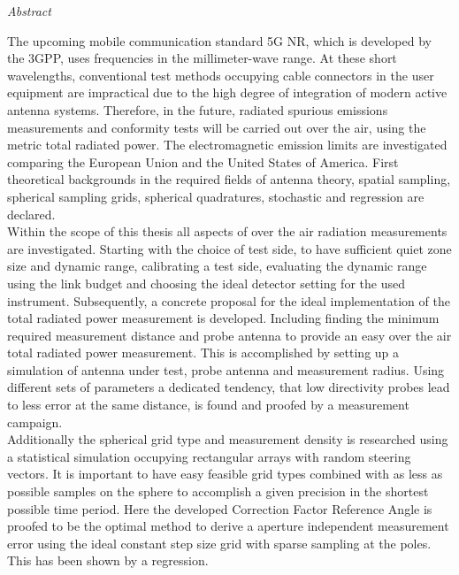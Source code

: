 

\newpage
\thispagestyle{empty}
\begin{center}
\Huge\emph{Abstract}
\end{center}
\medskip
\noindent

The upcoming mobile communication standard 5G NR, which is developed by the 3GPP, uses frequencies in the millimeter-wave range.
At these short wavelengths, conventional test methods occupying cable connectors in the user equipment are impractical due to the high degree of integration of modern active antenna systems.
Therefore, in the future, radiated spurious emissions measurements and conformity tests will be carried out over the air, using the metric total radiated power.
The electromagnetic emission limits are investigated comparing the European Union and the United States of America.
First theoretical backgrounds in the required fields of antenna theory, spatial sampling, spherical sampling grids, spherical quadratures, stochastic and regression are declared.\\

Within the scope of this thesis all aspects of over the air radiation measurements are investigated.
Starting with the choice of test side, to have sufficient quiet zone size and dynamic range, calibrating a test side, evaluating the dynamic range using the link budget and choosing the ideal detector setting for the used instrument.
Subsequently, a concrete proposal for the ideal implementation of the total radiated power measurement is developed.
Including finding the minimum required measurement distance and probe antenna to provide an easy over the air total radiated power measurement.
This is accomplished by setting up a simulation of antenna under test, probe antenna and measurement radius.
Using different sets of parameters a dedicated tendency, that low directivity probes lead to less error at the same distance, is found and proofed by a measurement campaign.\\

Additionally the spherical grid type and measurement density is researched using a statistical simulation occupying rectangular arrays with random steering vectors.
It is important to have easy feasible grid types combined with as less as possible samples on the sphere to accomplish a given precision in the shortest possible time period.
Here the developed Correction Factor Reference Angle is proofed to be the optimal method to derive a aperture independent measurement error using the ideal constant step size grid with sparse sampling at the poles.
This has been shown by a regression.

